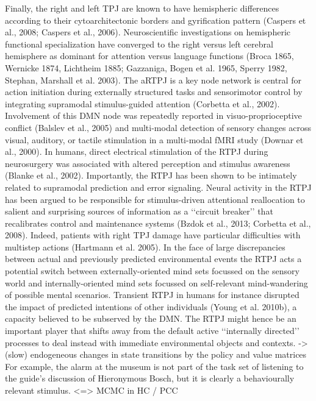 \documentclass{article} %
\begin{document}
Finally,
the right and left TPJ are known to have hemispheric differences
according to their cytoarchitectonic borders and gyrification pattern
(Caspers et al., 2008; Caspers et al., 2006).
Neuroscientific investigations on hemispheric functional specialization
have converged to the right versus left cerebral hemisphere as dominant for
attention versus language functions (Broca 1865, Wernicke 1874, Lichtheim 1885;
Gazzaniga, Bogen et al. 1965, Sperry 1982, Stephan, Marshall et al. 2003).
%
The aRTPJ is a key node network is central for
action initiation during externally structured tasks and
sensorimotor control by integrating supramodal stimulus-guided attention
(Corbetta et al., 2002).
Involvement of this DMN node was repeatedly reported in
visuo-proprioceptive conflict (Balslev et al., 2005) and
multi-modal detection of sensory changes across
visual, auditory, or tactile stimulation in a multi-modal fMRI study
(Downar et al., 2000).
In humans, direct electrical stimulation of the
RTPJ during neurosurgery was associated with altered perception
and stimulus awareness (Blanke et al., 2002).
%
Importantly, the RTPJ has been shown to be intimately related to
supramodal prediction and error signaling.
Neural activity in the RTPJ has been argued to be responsible 
for stimulus-driven attentional reallocation to 
salient and surprising sources of information
as a ‘‘circuit breaker’’ that recalibrates control and maintenance systems
(Bzdok et al., 2013; Corbetta et al., 2008).
Indeed, patients with right TPJ damage have particular difficulties
with multistep actions (Hartmann et al. 2005).
In the face of large discrepancies between actual and previously predicted
environmental events the RTPJ acts a potential switch between
externally-oriented mind sets focussed on the
sensory world and internally-oriented mind sets focussed
on self-relevant mind-wandering of possible mental scenarios.
Transient RTPJ in humans for instance disrupted the
impact of predicted intentions of other individuals (Young et al. 2010b),
a capacity believed to be subserved by the DMN.
The RTPJ might hence be an important player that shifts away
from the default active ‘‘internally directed’’ processes
to deal instead with immediate environmental objects and contexts.
-> (slow) endogeneous changes in state transitions by the policy and value matrices
For example, the alarm at the museum is not part of the task set of listening to the guide’s discussion of Hieronymous Bosch, but it is clearly a behaviourally relevant stimulus. <=> MCMC in HC / PCC
\end{document}
